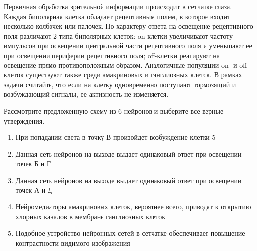 
Первичная обработка зрительной информации происходит в
сетчатке глаза. Каждая биполярная клетка обладает рецептивным полем, в которое
входит несколько колбочек или палочек. По характеру ответа на освещение
рецептивного поля различают 2 типа биполярных клеток: on-клетки увеличивают частоту импульсов при освещении центральной
части рецептивного поля и уменьшают ее при освещении периферии рецептивного
поля; off-клетки реагируют на
освещение прямо противоположным образом. Аналогичные популяции on- и off-клеток
существуют также среди амакриновых и ганглиозных клеток. В рамках задачи
считайте, что если на клетку одновременно поступают тормозящий и возбуждающий
сигналы, ее активность не изменяется.


Рассмотрите предложенную схему из 6 нейронов и
выберите все верные утверждения.

\begin{enumerate}
    \item При попадании света в точку В произойдет возбуждение клетки 5
    \item Данная сеть нейронов на выходе выдает одинаковый ответ при освещении точек Б и Г
    \item Данная сеть нейронов на выходе выдает одинаковый ответ при освещении точек А и Д
    \item Нейромедиаторы амакриновых клеток, вероятнее всего, приводят к открытию хлорных каналов в мембране ганглиозных клеток
    \item Подобное устройство нейронных сетей в сетчатке обеспечивает повышение контрастности видимого изображения
\end{enumerate}

\explanationSection

